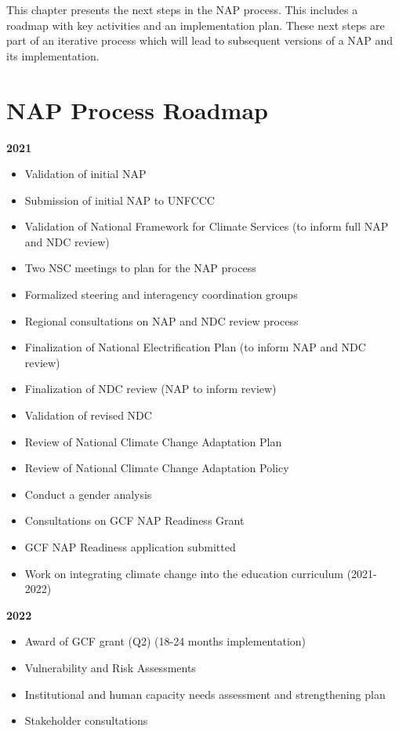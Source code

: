 \documentclass[
]{book}
\providecommand{\tightlist}{%
  \setlength{\itemsep}{0pt}\setlength{\parskip}{0pt}}
\begin{document}
This chapter presents the next steps in the NAP process. This includes a roadmap with key activities and an implementation plan. These next steps are part of an iterative process which will lead to subsequent versions of a NAP and its implementation.

\hypertarget{nap-process-roadmap}{%
\section{NAP Process Roadmap}\label{nap-process-roadmap}}

\textbf{2021}

\begin{itemize}
\tightlist
\item
  Validation of initial NAP
\item
  Submission of initial NAP to UNFCCC
\item
  Validation of National Framework for Climate Services (to inform full NAP and NDC review)
\item
  Two NSC meetings to plan for the NAP process
\item
  Formalized steering and interagency coordination groups
\item
  Regional consultations on NAP and NDC review process
\item
  Finalization of National Electrification Plan (to inform NAP and NDC review)
\item
  Finalization of NDC review (NAP to inform review)
\item
  Validation of revised NDC
\item
  Review of National Climate Change Adaptation Plan
\item
  Review of National Climate Change Adaptation Policy
\item
  Conduct a gender analysis
\item
  Consultations on GCF NAP Readiness Grant
\item
  GCF NAP Readiness application submitted
\item
  Work on integrating climate change into the education curriculum (2021-2022)
\end{itemize}

\textbf{2022}

\begin{itemize}
\tightlist
\item
  Award of GCF grant (Q2) (18-24 months implementation)
\item
  Vulnerability and Risk Assessments
\item
  Institutional and human capacity needs assessment and strengthening plan
\item
  Stakeholder consultations
\end{itemize}
\end{document}
